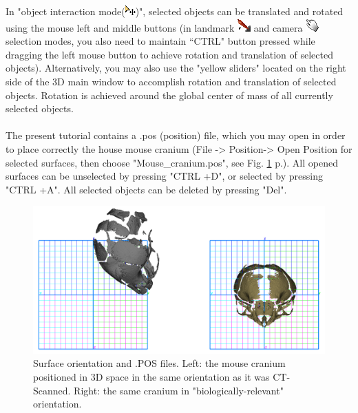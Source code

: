 \documentclass[12pt, a4paper]{book}
\begin{document}
In "object interaction mode(\includegraphics[scale=0.7]{../images/04/move_mode.png})", selected objects can be translated and rotated using the mouse left and middle buttons (in landmark \includegraphics[scale=0.7]{../images/04/Landmarks2.png} and camera  \includegraphics[scale=0.7]{../images/04/camera_mode.png} selection modes, you also need to maintain ``CTRL" button pressed while dragging the left mouse button to achieve rotation and translation of selected objects). Alternatively, you may also use the "yellow sliders" located on the right side of the 3D main window to accomplish rotation and translation of selected objects. Rotation is achieved around the global center of mass of all currently selected objects.\\
\\
The present tutorial contains a .pos (position) file, which you may open in order to place correctly the house
mouse cranium (File -> Position-> Open Position for selected surfaces, then choose "Mouse\_cranium.pos", see Fig. \ref{orientation} p.\pageref{orientation}). 
All opened surfaces can be unselected by pressing "CTRL +D", or selected by pressing "CTRL +A". All selected objects can be deleted by pressing "Del".

\begin{figure}
  \centering
  \includegraphics[scale=0.35]{pos.png} 
	\caption{Surface orientation and .POS files.  Left: the mouse cranium positioned in 3D space in the same orientation as it was CT-Scanned. Right: the same cranium in "biologically-relevant" orientation.}
\label{orientation}
 
\end{figure}
\end{document}
